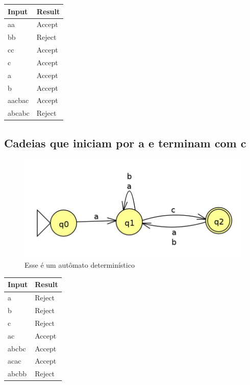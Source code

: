 \documentclass[11pt]{article}
\begin{document}
\begin{center}
\begin{tabular}{ll}
Input & Result\\
\hline
aa & Accept\\
bb & Reject\\
cc & Accept\\
c & Accept\\
a & Accept\\
b & Accept\\
aacbac & Accept\\
abcabc & Reject\\
\end{tabular}
\end{center}
\subsection{Cadeias que iniciam por a e terminam com c}
\label{sec:org4432cda}
\begin{figure}[htbp]
\centering
\includegraphics[width=.9\linewidth]{./q1/d/q1d.jpg}
\caption{\label{fig:org8dd9e3a}
Esse é um autômato determinístico}
\end{figure}

\begin{center}
\begin{tabular}{ll}
Input & Result\\
\hline
a & Reject\\
b & Reject\\
c & Reject\\
ac & Accept\\
abcbc & Accept\\
acac & Accept\\
abcbb & Reject\\
\end{tabular}
\end{center}
\end{document}
